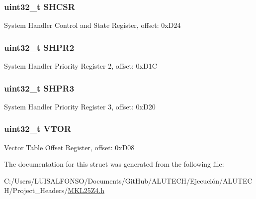 \subsubsection[{S\+H\+C\+S\+R}]{\setlength{\rightskip}{0pt plus 5cm}uint32\+\_\+t S\+H\+C\+S\+R}\label{struct_s_c_b___mem_map_aabb6b7677f7a0a50ce6fae3b63eb943d}
System Handler Control and State Register, offset\+: 0x\+D24 \hypertarget{struct_s_c_b___mem_map_a4fa6448cb8510e61433afa5f024a1579}{}
\subsubsection[{S\+H\+P\+R2}]{\setlength{\rightskip}{0pt plus 5cm}uint32\+\_\+t S\+H\+P\+R2}\label{struct_s_c_b___mem_map_a4fa6448cb8510e61433afa5f024a1579}
System Handler Priority Register 2, offset\+: 0x\+D1\+C \hypertarget{struct_s_c_b___mem_map_aa7e2c4b036de2b98b1b578b4e638978c}{}
\subsubsection[{S\+H\+P\+R3}]{\setlength{\rightskip}{0pt plus 5cm}uint32\+\_\+t S\+H\+P\+R3}\label{struct_s_c_b___mem_map_aa7e2c4b036de2b98b1b578b4e638978c}
System Handler Priority Register 3, offset\+: 0x\+D20 \hypertarget{struct_s_c_b___mem_map_a3799e3af2b9f5d2f0740354953ba509d}{}
\subsubsection[{V\+T\+O\+R}]{\setlength{\rightskip}{0pt plus 5cm}uint32\+\_\+t V\+T\+O\+R}\label{struct_s_c_b___mem_map_a3799e3af2b9f5d2f0740354953ba509d}
Vector Table Offset Register, offset\+: 0x\+D08 

The documentation for this struct was generated from the following file\+:\begin{DoxyCompactItemize}
\item 
C\+:/\+Users/\+L\+U\+I\+S\+A\+L\+F\+O\+N\+S\+O/\+Documents/\+Git\+Hub/\+A\+L\+U\+T\+E\+C\+H/\+Ejecución/\+A\+L\+U\+T\+E\+C\+H/\+Project\+\_\+\+Headers/\hyperlink{_m_k_l25_z4_8h}{M\+K\+L25\+Z4.\+h}\end{DoxyCompactItemize}

